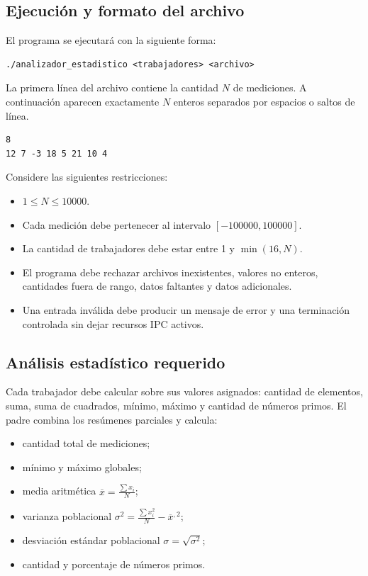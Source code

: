 \documentclass[12pt,a4paper]{article}
\begin{document}
\subsection*{Ejecución y formato del archivo}
El programa se ejecutará con la siguiente forma:

\begin{lstlisting}[language={}, numbers=none]
./analizador_estadistico <trabajadores> <archivo>
\end{lstlisting}

La primera línea del archivo contiene la cantidad $N$ de mediciones. A continuación aparecen exactamente $N$ enteros separados por espacios o saltos de línea.

\begin{lstlisting}[language={}, numbers=none]
8
12 7 -3 18 5 21 10 4
\end{lstlisting}

Considere las siguientes restricciones:
\begin{itemize}
    \item $1 \leq N \leq 10000$.
    \item Cada medición debe pertenecer al intervalo $[-100000,100000]$.
    \item La cantidad de trabajadores debe estar entre 1 y $\min(16,N)$.
    \item El programa debe rechazar archivos inexistentes, valores no enteros, cantidades fuera de rango, datos faltantes y datos adicionales.
    \item Una entrada inválida debe producir un mensaje de error y una terminación controlada sin dejar recursos IPC activos.
\end{itemize}

\subsection*{Análisis estadístico requerido}
Cada trabajador debe calcular sobre sus valores asignados: cantidad de elementos, suma, suma de cuadrados, mínimo, máximo y cantidad de números primos. El padre combina los resúmenes parciales y calcula:
\begin{itemize}
    \item cantidad total de mediciones;
    \item mínimo y máximo globales;
    \item media aritmética $\overline{x} = \frac{\sum x_i}{N}$;
    \item varianza poblacional $\sigma^2 = \frac{\sum x_i^2}{N} - \overline{x}^{,2}$;
    \item desviación estándar poblacional $\sigma = \sqrt{\sigma^2}$;
    \item cantidad y porcentaje de números primos.
\end{itemize}
\end{document}
